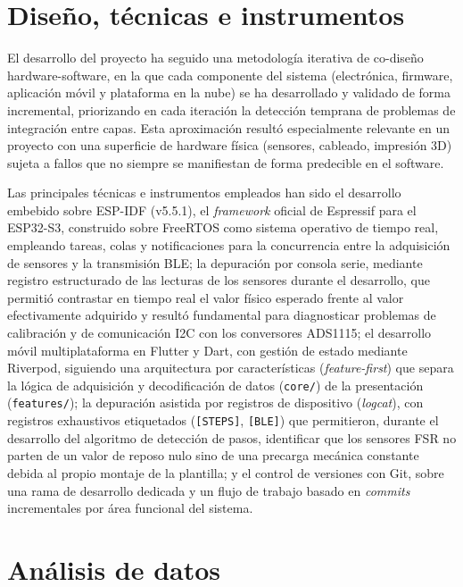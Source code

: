\begin{IAtext}

\section{Diseño, técnicas e instrumentos}

El desarrollo del proyecto ha seguido una metodología iterativa de co-diseño hardware-software, en la que cada componente del sistema (electrónica, firmware, aplicación móvil y plataforma en la nube) se ha desarrollado y validado de forma incremental, priorizando en cada iteración la detección temprana de problemas de integración entre capas. Esta aproximación resultó especialmente relevante en un proyecto con una superficie de hardware física (sensores, cableado, impresión 3D) sujeta a fallos que no siempre se manifiestan de forma predecible en el software.

Las principales técnicas e instrumentos empleados han sido el desarrollo embebido sobre ESP-IDF (v5.5.1), el \textit{framework} oficial de Espressif para el ESP32-S3, construido sobre FreeRTOS como sistema operativo de tiempo real, empleando tareas, colas y notificaciones para la concurrencia entre la adquisición de sensores y la transmisión BLE; la depuración por consola serie, mediante registro estructurado de las lecturas de los sensores durante el desarrollo, que permitió contrastar en tiempo real el valor físico esperado frente al valor efectivamente adquirido y resultó fundamental para diagnosticar problemas de calibración y de comunicación I2C con los conversores ADS1115; el desarrollo móvil multiplataforma en Flutter y Dart, con gestión de estado mediante Riverpod, siguiendo una arquitectura por características (\textit{feature-first}) que separa la lógica de adquisición y decodificación de datos (\texttt{core/}) de la presentación (\texttt{features/}); la depuración asistida por registros de dispositivo (\textit{logcat}), con registros exhaustivos etiquetados (\texttt{[STEPS]}, \texttt{[BLE]}) que permitieron, durante el desarrollo del algoritmo de detección de pasos, identificar que los sensores FSR no parten de un valor de reposo nulo sino de una precarga mecánica constante debida al propio montaje de la plantilla; y el control de versiones con Git, sobre una rama de desarrollo dedicada y un flujo de trabajo basado en \textit{commits} incrementales por área funcional del sistema.

\section{Análisis de datos}


\end{IAtext}
